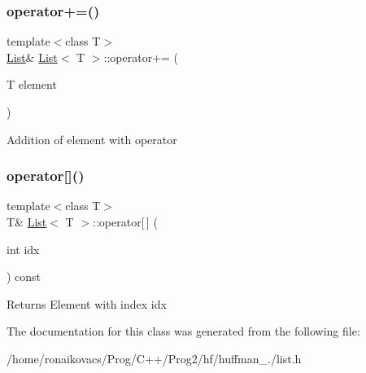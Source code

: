 \subsubsection{\texorpdfstring{operator+=()}{operator+=()}}
{\footnotesize\ttfamily template$<$class T$>$ \\
\hyperlink{class_list}{List}\& \hyperlink{class_list}{List}$<$ T $>$\+::operator+= (\begin{DoxyParamCaption}\item[{T}]{element }\end{DoxyParamCaption})\hspace{0.3cm}{\ttfamily [inline]}}

Addition of element with operator \mbox{\label{class_list_af9d0336374aa0025662e16f2b087819c}} 
\subsubsection{\texorpdfstring{operator[]()}{operator[]()}}
{\footnotesize\ttfamily template$<$class T$>$ \\
T\& \hyperlink{class_list}{List}$<$ T $>$\+::operator\mbox{[}$\,$\mbox{]} (\begin{DoxyParamCaption}\item[{int}]{idx }\end{DoxyParamCaption}) const\hspace{0.3cm}{\ttfamily [inline]}}

\begin{DoxyReturn}{Returns}
Element with index \textquotesingle{}idx\textquotesingle{} 
\end{DoxyReturn}


The documentation for this class was generated from the following file\+:\begin{DoxyCompactItemize}
\item 
/home/ronaikovacs/\+Prog/\+C++/\+Prog2/hf/huffman\+\_./list.\+h\end{DoxyCompactItemize}

